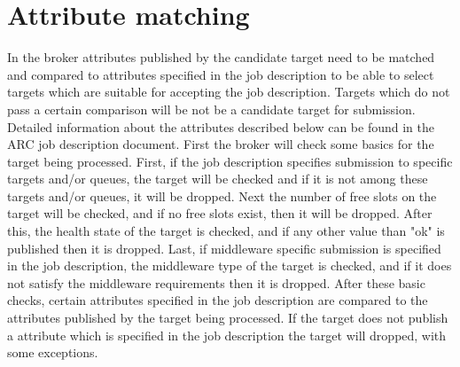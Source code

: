\documentclass[twoside,english]{article}
\begin{document}
\section{Attribute matching}\label{sec:Attribute-matching}

In the broker attributes published by the candidate target need to
be matched and compared to attributes specified in the job description
to be able to select targets which are suitable for accepting the
job description. Targets which do not pass a certain comparison will
be not be a candidate target for submission. Detailed information
about the attributes described below can be found in the ARC job description
document. First the broker will check some basics for the target being
processed. First, if the job description specifies submission to specific
targets and/or queues, the target will be checked and if it is not
among these targets and/or queues, it will be dropped. Next the number
of free slots on the target will be checked, and if no free slots
exist, then it will be dropped. After this, the health state of the
target is checked, and if any other value than "ok"
is published then it is dropped. Last, if middleware specific submission
is specified in the job description, the middleware type of the target
is checked, and if it does not satisfy the middleware requirements
then it is dropped. After these basic checks, certain attributes specified
in the job description are compared to the attributes published by
the target being processed. If the target does not publish a attribute
which is specified in the job description the target will dropped,
with some exceptions.
\end{document}
